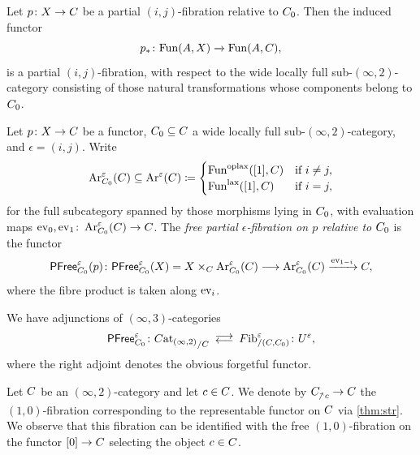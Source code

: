 \documentclass[a4paper,reqno,twoside]{amsart}
\begin{document}
\begin{proposition}\label{prop:fibfunct}
	Let $p \colon \relax{X} \to \relax{C}$ be a partial $(i,j)$-fibration relative to $\relax{C}_0$. Then the induced functor 
	\[
		p_* \colon \mathrm{Fun}(\relax{A},\relax{X}) \xrightarrow{} \mathrm{Fun}(\relax{A},\relax{C}),
	\]
	is a partial $(i,j)$-fibration, with respect to the wide locally full sub-$(\infty,2)$-category consisting of those natural transformations whose components belong to $\relax{C}_0$.
\end{proposition}



\begin{definition}\label{def:freepartial}
	Let $p \colon \relax{X} \to \relax{C}$ be a functor, $\relax{C}_0 \subseteq \relax{C}$ a wide locally full sub-$(\infty,2)$-category, and $\epsilon=(i,j)$. Write
	\[
		\operatorname{Ar}^{\varepsilon}_{\relax{C}_0}(\relax{C}) \subseteq \operatorname{Ar}^{\varepsilon}(\relax{C}) \coloneqq \begin{cases}
			\mathrm{Fun}^{\mathrm{oplax}}([1],\relax{C}) & \text{if } i \neq j, \\
			\mathrm{Fun}^{\mathrm{lax}}([1],\relax{C}) & \text{if } i = j,
		\end{cases}
	\]
	for the full subcategory spanned by those morphisms lying in $\relax{C}_0$, with evaluation maps $\operatorname{ev}_0,\operatorname{ev}_1 \colon \operatorname{Ar}^{\varepsilon}_{\relax{C}_0}(\relax{C}) \to \relax{C}$. The \emph{free partial $\epsilon$-fibration on $p$ relative to $\relax{C}_0$} is the functor
	\[
		\mathsf{PFree}^{\varepsilon}_{\relax{C}_0}(p)\colon \mathsf{PFree}^{\varepsilon}_{\relax{C}_0}(\relax{X})=\relax{X} \times_{\relax{C}} \operatorname{Ar}^{\varepsilon}_{\relax{C}_0}(\relax{C}) \longrightarrow \operatorname{Ar}^{\varepsilon}_{\relax{C}_0}(\relax{C}) \xrightarrow{\operatorname{ev}_{1-i}} \relax{C},
	\]
	where the fibre product is taken along $\operatorname{ev}_i$.
\end{definition}

\begin{theorem}\label{thm:pfree}
	We have adjunctions of $(\infty,3)$-categories
	\[
		\PFree^{\epsilon}_{\cC_0}\colon {\Cat_{(\infty,2)}}_{/\cC} \llra \Fib^{\epsilon}_{/(\cC,\cC_0)}\colon U^{\epsilon}, 
	\]
	where the right adjoint denotes the obvious forgetful functor.
\end{theorem}


\begin{definition}
	Let $\relax{C}$ be an $(\infty,2)$-category and let $c \in \relax{C}$. We denote by $\cC_{\upslash c} \to \cC$ the $(1,0)$-fibration corresponding to the representable functor on $\relax{C}$ via \cref{thm:str}. We observe that this fibration can be identified with the free $(1,0)$-fibration on the functor $[0] \to \relax{C}$ selecting the object $c \in \relax{C}$.
\end{definition}
\end{document}
